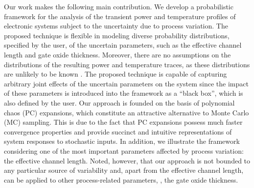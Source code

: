 Our work makes the following main contribution.
We develop a probabilistic framework for the analysis of the transient power and temperature profiles of electronic systems subject to the uncertainty due to process variation.
The proposed technique is flexible in modeling diverse probability distributions, specified by the user, of the uncertain parameters, such as the effective channel length and gate oxide thickness.
Moreover, there are no assumptions on the distributions of the resulting power and temperature traces, as these distributions are unlikely to be known \apriori.
The proposed technique is capable of capturing arbitrary joint effects of the uncertain parameters on the system since the impact of these parameters is introduced into the framework as a ``black box'', which is also defined by the user.
Our approach is founded on the basis of polynomial chaos (PC) expansions, which constitute an attractive alternative to Monte Carlo (MC) sampling.
This is due to the fact that PC expansions possess much faster convergence properties and provide succinct and intuitive representations of system responses to stochastic inputs.
In addition, we illustrate the framework considering one of the most important parameters affected by process variation: the effective channel length.
Noted, however, that our approach is not bounded to any particular source of variability and, apart from the effective channel length, can be applied to other process-related parameters, \eg, the gate oxide thickness.
